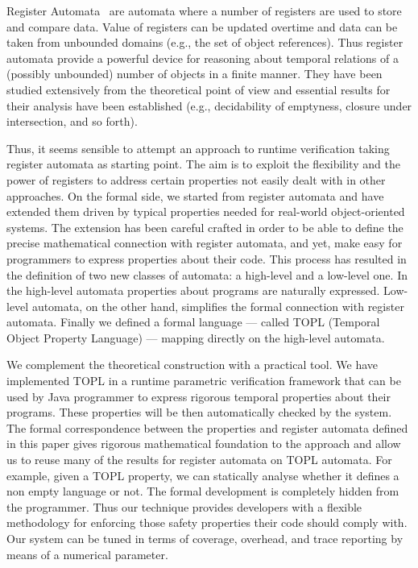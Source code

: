 \documentclass[9pt, preprint]{sigplanconf} %
\theoremstyle{definition}
\theoremstyle{remark}
\begin{document}
Register Automata~\cite{dblp:conf/focs/kaminskif90} are automata where a number of registers are used to store and compare data. Value of registers can be updated overtime and  data can be taken from unbounded domains (e.g., the set of object references). Thus register automata provide a powerful device for reasoning about temporal 
relations of a (possibly unbounded) number of objects in a finite manner. They have been studied extensively from the theoretical point of
view and essential results for their analysis have been established (e.g., decidability of emptyness, closure under intersection, and so forth).

Thus, it seems sensible to attempt an approach to runtime verification taking register automata as starting point. The aim is to
exploit the flexibility and the power of registers to
address certain properties not easily dealt with in other approaches.
On the formal side, we started from register automata and have extended them driven by typical properties needed for real-world object-oriented systems.
The extension has been careful crafted in order to be able to define the precise mathematical connection with register automata, and yet,
make easy for programmers to express properties about their code. This process has resulted in the definition of two new classes of 
automata: a high-level and a low-level one. In the high-level automata properties about programs are naturally expressed. Low-level automata, 
on the other hand, simplifies the formal connection with  register automata. 
Finally we defined a formal language --- called TOPL (Temporal Object Property Language) --- mapping directly on the 
high-level automata.

We complement the theoretical construction with a practical tool.
We have implemented TOPL  in a runtime parametric verification framework that can be used by Java programmer to express rigorous temporal 
properties about their programs. These properties will be then automatically checked by the system.
The formal correspondence between the properties and register automata defined in this paper gives rigorous mathematical foundation to
the approach and allow us to reuse many of the results for register automata on TOPL automata. For example, given a TOPL property, we can statically analyse whether it defines a non empty language or not.  The formal development is completely hidden from 
the programmer.  Thus our technique provides developers with a flexible methodology for enforcing those safety properties their code should comply with. 
Our system can be tuned  in terms of coverage,  overhead, and trace reporting by means of a numerical parameter. 
\end{document}
